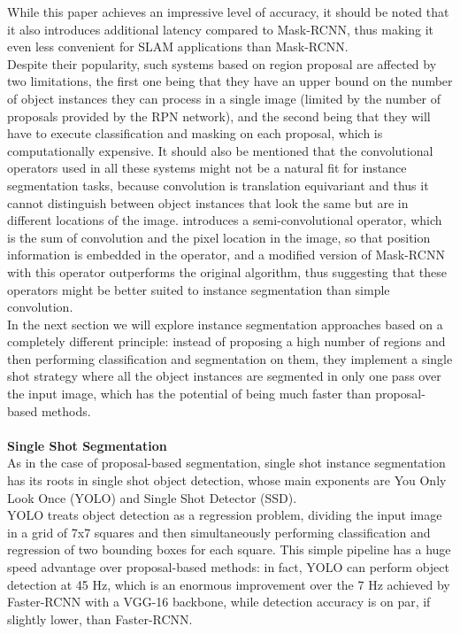\documentclass[12pt,twoside]{report}
\begin{document}
While this paper achieves an impressive level of accuracy, it should be noted that it also introduces additional latency compared to Mask-RCNN, thus making it even less convenient for SLAM applications than Mask-RCNN.
\\

Despite their popularity, such systems based on region proposal are affected by two limitations, the first one being that they have an upper bound on the number of object instances they can process in a single image (limited by the number of proposals provided by the RPN network), and the second being that they will have to execute classification and masking on each proposal, which is computationally expensive. It should also be mentioned that the convolutional operators used in all these systems might not be a natural fit for instance segmentation tasks, because convolution is translation equivariant and thus it cannot distinguish between object instances that look the same but are in different locations of the image. \cite{semiconvolutional} introduces a semi-convolutional operator, which is the sum of convolution and the pixel location in the image, so that position information is embedded in the operator, and a modified version of Mask-RCNN with this operator outperforms the original algorithm, thus suggesting that these operators might be better suited to instance segmentation than simple convolution.
\\

In the next section we will explore instance segmentation approaches based on a completely different principle: instead of proposing a high number of regions and then performing classification and segmentation on them, they implement a single shot strategy where all the object instances are segmented in only one pass over the input image, which has the potential of being much faster than proposal-based methods.
\\
\\

\textbf{Single Shot Segmentation}
\\

As in the case of proposal-based segmentation, single shot instance segmentation has its roots in single shot object detection, whose main exponents are You Only Look Once (YOLO) and Single Shot Detector (SSD).
\\

YOLO \cite{yolo} treats object detection as a regression problem, dividing the input image in a grid of 7x7 squares and then simultaneously performing classification and regression of two bounding boxes for each square. This simple pipeline has a huge speed advantage over proposal-based methods: in fact, YOLO can perform object detection at 45 Hz, which is an enormous improvement over the 7 Hz achieved by Faster-RCNN with a VGG-16 backbone, while detection accuracy is on par, if slightly lower, than Faster-RCNN.
\end{document}
